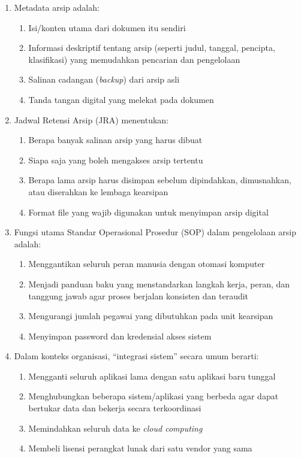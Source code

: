\documentclass[12pt,a4paper]{report}
\begin{document}
\begin{enumerate}[leftmargin=*, itemsep=0.5cm]
\item Metadata arsip adalah:
\begin{enumerate}[label=\Alph*., nosep]
    \item Isi/konten utama dari dokumen itu sendiri
    \item Informasi deskriptif tentang arsip (seperti judul, tanggal, pencipta, klasifikasi) yang memudahkan pencarian dan pengelolaan
    \item Salinan cadangan (\textit{backup}) dari arsip asli
    \item Tanda tangan digital yang melekat pada dokumen
\end{enumerate}

\item Jadwal Retensi Arsip (JRA) menentukan:
\begin{enumerate}[label=\Alph*., nosep]
    \item Berapa banyak salinan arsip yang harus dibuat
    \item Siapa saja yang boleh mengakses arsip tertentu
    \item Berapa lama arsip harus disimpan sebelum dipindahkan, dimusnahkan, atau diserahkan ke lembaga kearsipan
    \item Format file yang wajib digunakan untuk menyimpan arsip digital
\end{enumerate}

\item Fungsi utama Standar Operasional Prosedur (SOP) dalam pengelolaan arsip adalah:
\begin{enumerate}[label=\Alph*., nosep]
    \item Menggantikan seluruh peran manusia dengan otomasi komputer
    \item Menjadi panduan baku yang menstandarkan langkah kerja, peran, dan tanggung jawab agar proses berjalan konsisten dan teraudit
    \item Mengurangi jumlah pegawai yang dibutuhkan pada unit kearsipan
    \item Menyimpan password dan kredensial akses sistem
\end{enumerate}

\item Dalam konteks organisasi, ``integrasi sistem'' secara umum berarti:
\begin{enumerate}[label=\Alph*., nosep]
    \item Mengganti seluruh aplikasi lama dengan satu aplikasi baru tunggal
    \item Menghubungkan beberapa sistem/aplikasi yang berbeda agar dapat bertukar data dan bekerja secara terkoordinasi
    \item Memindahkan seluruh data ke \textit{cloud computing}
    \item Membeli lisensi perangkat lunak dari satu vendor yang sama
\end{enumerate}


\end{enumerate}
\end{document}
